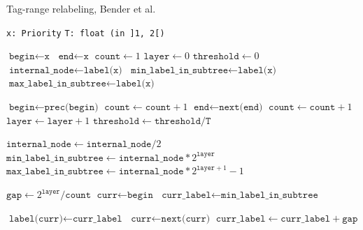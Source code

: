 \documentclass[12pt]{article}
\begin{document}
\begin{algorithm}
    \caption{Tag-range relabeling, Bender et al.} \label{alg:bender}

    \begin{algorithmic}
        \Require \texttt{x: Priority}
        \Require \texttt{T: float (in ]1, 2[)}




        \State $\texttt{begin} \gets \texttt{x}$
        \State $\texttt{end} \gets \texttt{x}$
        \State $\texttt{count} \gets 1$
        \State $\texttt{layer} \gets 0$
        \State $\texttt{threshold} \gets 0$
        \State $\texttt{internal\_node} \gets \texttt{label(x)}$
        \State $\texttt{min\_label\_in\_subtree} \gets \texttt{label(x)}$
        \State $\texttt{max\_label\_in\_subtree} \gets \texttt{label(x)}$


        \State $\texttt{begin} \gets \texttt{prec(begin)}$
        \State $\texttt{count} \gets \texttt{count} + 1$
        \EndWhile
        \State $\texttt{end} \gets \texttt{next(end)}$
        \State $\texttt{count} \gets \texttt{count} + 1$
        \EndWhile
        \State $\texttt{layer} \gets \texttt{layer} + 1$
        \State $\texttt{threshold} \gets \texttt{threshold} / \texttt{T}$

        \State $\texttt{internal\_node} \gets \texttt{internal\_node} / 2$ 
        \State $\texttt{min\_label\_in\_subtree} \gets \texttt{internal\_node} * 2^{\texttt{layer}}$ 
        \State $\texttt{max\_label\_in\_subtree} \gets \texttt{internal\_node} * 2^{\texttt{layer} + 1} - 1$ 
        \EndWhile


        \State $\texttt{gap} \gets 2^{\texttt{layer}} / \texttt{count}$
        \State $\texttt{curr} \gets \texttt{begin}$
        \State $\texttt{curr\_label} \gets \texttt{min\_label\_in\_subtree}$

        \State $\texttt{label(curr)} \gets \texttt{curr\_label}$
        \State $\texttt{curr} \gets \texttt{next(curr)}$
        \State $\texttt{curr\_label} \gets \texttt{curr\_label} + \texttt{gap}$
        \EndWhile


\end{algorithmic}
\end{algorithm}
\end{document}
